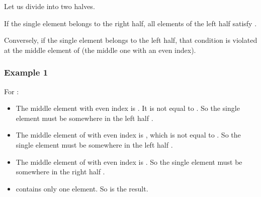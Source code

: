 \documentclass[letterpaper,12pt,english]{book}
\begin{document}
\sphinxAtStartPar
Let us divide  into two halves.

\sphinxAtStartPar
If the single element belongs to the right half, all elements of the left half satisfy .

\sphinxAtStartPar
Conversely, if the single element belongs to the left half, that condition is violated at the middle element of  (the middle one with an even index).


\subsubsection{Example 1}
\label{\detokenize{Binary_Search/540_Single_Element_in_a_Sorted_Array:id1}}
\sphinxAtStartPar
For :
\begin{itemize}
\item {} 
\sphinxAtStartPar
The middle element with even index is . It is not equal to . So the single element must be somewhere in the left half \sphinxcode{\sphinxupquote{{[}1,1,2,3,3{]}}}.

\item {} 
\sphinxAtStartPar
The middle element of  with even index is , which is not equal to . So the single element must be somewhere in the left half \sphinxcode{\sphinxupquote{{[}1,1,2{]}}}.

\item {} 
\sphinxAtStartPar
The middle element of  with even index is . So the single element must be somewhere in the right half \sphinxcode{\sphinxupquote{{[}2{]}}}.

\item {} 
\sphinxAtStartPar
{} contains only one element. So  is the result.

\end{itemize}
\end{document}

